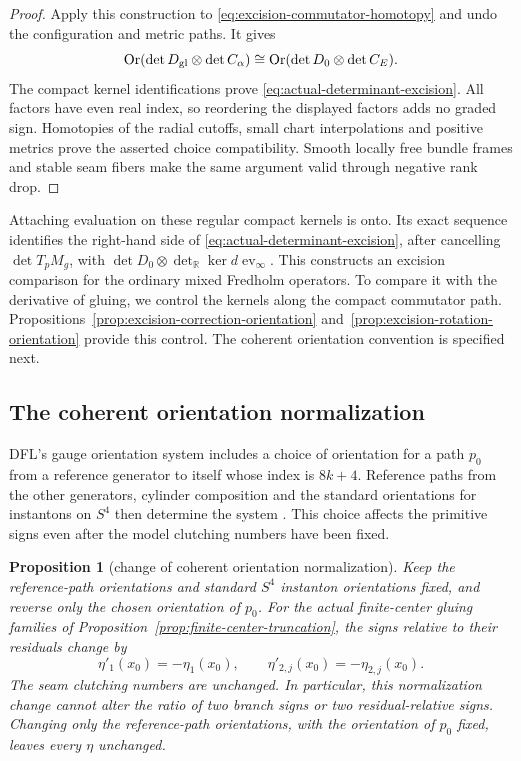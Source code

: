\documentclass[11pt]{amsart}
\newtheorem{proposition}[theorem]{Proposition}
\theoremstyle{definition}
\theoremstyle{remark}
\theoremstyle{plain}
\begin{document}
\begin{proof}
Apply this construction to
\eqref{eq:excision-commutator-homotopy} and undo the configuration
and metric paths. It gives
\[
 \operatorname{Or}(\det D_{\rm gl}\otimes\det C_\alpha)
       \cong\operatorname{Or}(\det D_0\otimes\det C_E).
\]
The compact kernel identifications prove
\eqref{eq:actual-determinant-excision}. All factors have even
real index, so reordering the displayed factors adds no
graded sign. Homotopies of the radial cutoffs, small chart
interpolations and positive metrics prove the asserted
choice compatibility. Smooth locally free bundle frames and
stable seam fibers make the same argument valid through
negative rank drop.
\end{proof}

Attaching evaluation on these regular compact kernels is onto.
Its exact sequence identifies the right-hand side of
\eqref{eq:actual-determinant-excision}, after cancelling
$\det T_pM_g$, with
$\det D_0\otimes\det_{\mathbb R}\ker d\operatorname{ev}_\infty$.
This constructs an excision comparison for the ordinary mixed
Fredholm operators. To compare it with the derivative of gluing,
we control the kernels along the compact commutator path.
Propositions~\ref{prop:excision-correction-orientation}
and~\ref{prop:excision-rotation-orientation} provide this control.
The coherent orientation convention is specified next.

\subsection{The coherent orientation normalization}
\label{sec:primitive-orientation-normalization}

DFL's gauge orientation system includes a choice of orientation
for a path $p_0$ from a reference generator to itself whose index
is $8k+4$. Reference paths from the other generators, cylinder
composition and the standard orientations for instantons on $S^4$
then determine the system
\cite[Section~2.4, pp.~21--22]{DaeFukLip21a}.
This choice affects the primitive signs even after the model
clutching numbers have been fixed.

\begin{proposition}[change of coherent orientation normalization]
\label{prop:primitive-orientation-normalization}
Keep the reference-path orientations and standard $S^4$
instanton orientations fixed, and reverse only the chosen
orientation of $p_0$. For the actual finite-center gluing
families of Proposition~\ref{prop:finite-center-truncation},
the signs relative to their residuals change by
\begin{equation}\label{eq:primitive-normalization-reversal}
                 \eta'_1(x_0)=-\eta_1(x_0),\qquad
                 \eta'_{2,j}(x_0)=-\eta_{2,j}(x_0).
\end{equation}
The seam clutching numbers are unchanged. In particular, this
normalization change cannot alter the ratio of two branch
signs or two residual-relative signs.
Changing only the reference-path orientations, with the
orientation of $p_0$ fixed, leaves every $\eta$ unchanged.
\end{proposition}
\end{document}
